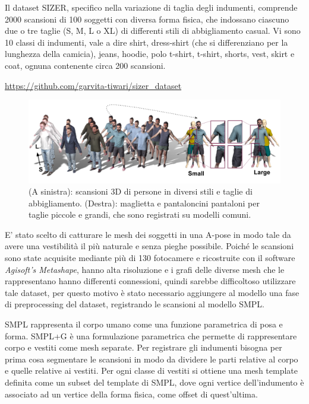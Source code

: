 Il dataset SIZER, specifico nella variazione di taglia degli indumenti, comprende 2000 scansioni di 100 soggetti con diversa forma fisica, che indossano ciascuno due o tre taglie (S, M, L o XL) di differenti stili di abbigliamento casual. Vi sono 10 classi di indumenti, vale a dire shirt, dress-shirt (che si differenziano per la lunghezza della camicia), jeans, hoodie, polo t-shirt, t-shirt, shorts, vest, skirt e coat, ognuna contenente circa 200 scansioni.

\url{https://github.com/garvita-tiwari/sizer_dataset}

\medskip\medskip\medskip


\begin{figure}[ht!]
  \centering
  \includegraphics[scale=0.4]{Images/SizerPic/SizerDataset.png}
  \caption{(A sinistra): scansioni 3D di
persone in diversi stili e taglie di abbigliamento. (Destra): maglietta e pantaloncini
pantaloni per taglie piccole e grandi, che sono registrati su modelli comuni.}
  \label{fig:SizerDataset}
\end{figure}

\medskip\medskip\medskip

E’ stato scelto di catturare le mesh dei soggetti in una A-pose in modo tale da avere una vestibilità il più naturale e senza pieghe possibile.
Poiché le scansioni sono state acquisite mediante più di 130 fotocamere e ricostruite con il software \textit{Agisoft’s Metashape}, hanno alta risoluzione e i grafi delle diverse mesh che le rappresentano hanno differenti connessioni, quindi sarebbe difficoltoso utilizzare tale dataset, per questo motivo è stato necessario aggiungere al modello una fase di preprocessing del dataset, registrando le scansioni al modello SMPL.

\medskip\medskip\medskip

SMPL rappresenta il corpo umano come una funzione parametrica di posa e forma.
SMPL+G è una formulazione parametrica che permette di rappresentare corpo e vestiti come mesh separate. Per registrare gli indumenti bisogna per prima cosa segmentare le scansioni in modo da dividere le parti relative al corpo e quelle relative ai vestiti. Per ogni classe di vestiti si ottiene una mesh template definita come un subset del template di SMPL, dove ogni vertice dell’indumento è associato ad un vertice della forma fisica, come offset di quest’ultima.

